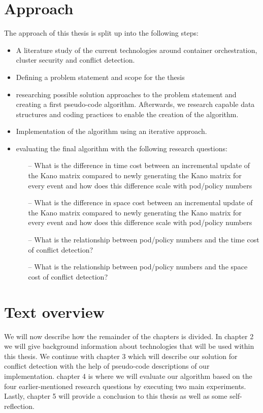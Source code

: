 \section{Approach } \label{sec:approach}
The approach of this thesis is split up into the following steps:
\begin{itemize}
    \renewcommand{\labelitemi}{\scriptsize$\blacksquare$}
     \item A literature study of the current technologies around container orchestration, cluster security and conflict detection.
    \item Defining a problem statement and scope for the thesis
    \item researching possible solution approaches to the problem statement and creating a first pseudo-code algorithm. Afterwards, we research capable data structures and coding practices to enable the creation of the algorithm.
    \item Implementation of the algorithm using an iterative approach.
    \item evaluating the final algorithm with the following research questions:

    \begin{enumerate}
        \item[--] What is the difference in time cost between an incremental update of the Kano matrix compared to newly generating the Kano matrix for every event and how does this difference scale with pod/policy numbers
        \item[--] What is the difference in space cost between an incremental update of the Kano matrix compared to newly generating the Kano matrix for every event and how does this difference scale with pod/policy numbers
        \item[--] What is the relationship between pod/policy numbers and the time cost of conflict detection?
        \item[--] What is the relationship between pod/policy numbers and the space cost of conflict detection?
    \end{enumerate}
\end{itemize}


\section{Text overview} \label{sec:textoverview}
We will now describe how the remainder of the chapters is divided. In chapter 2 we will give background information about technologies that will be used within this thesis. We continue with chapter 3 which will describe our solution for conflict detection with the help of pseudo-code descriptions of our implementation. chapter 4 is where we will evaluate our algorithm based on the four earlier-mentioned research questions by executing two main experiments. Lastly, chapter 5 will provide a conclusion to this thesis as well as some self-reflection.
\cleardoublepage
